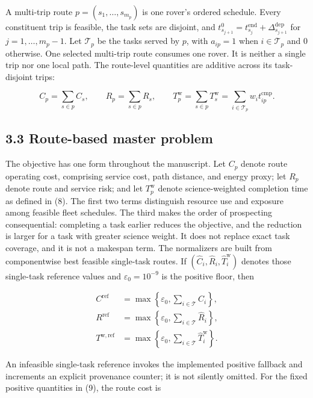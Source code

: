 \documentclass[
  11pt,
]{article}
\begin{document}
A multi-trip route \(p=(s_1,\ldots,s_{m_p})\) is one rover's ordered
schedule. Every constituent trip is feasible, the task sets are
disjoint, and
\(t_{s_{j+1}}^0=t_{s_j}^{\mathrm{end}}+ \Delta_{s_{j+1}}^{\mathrm{dep}}\)
for \(j=1,\ldots,m_p-1\). Let \(\mathcal{T}_p\) be the tasks served by
\(p\), with \(a_{ip}=1\) when \(i\in\mathcal{T}_p\) and \(0\) otherwise.
One selected multi-trip route consumes one rover. It is neither a single
trip nor one local path. The route-level quantities are additive across
its task-disjoint trips:

\[
C_p=\sum_{s\in p}C_s,\qquad
R_p=\sum_{s\in p}R_s,\qquad
T_p^{\mathrm{w}}=\sum_{s\in p}T_s^{\mathrm{w}}
=\sum_{i\in\mathcal{T}_p}w_i t_{ip}^{\mathrm{cmp}}.
\tag{8}
\]

\hypertarget{route-based-master-problem}{%
\subsection{3.3 Route-based master
problem}\label{route-based-master-problem}}

The objective has one form throughout the manuscript. Let \(C_p\) denote
route operating cost, comprising service cost, path distance, and energy
proxy; let \(R_p\) denote route and service risk; and let
\(T_p^{\mathrm{w}}\) denote science-weighted completion time as defined
in (8). The first two terms distinguish resource use and exposure among
feasible fleet schedules. The third makes the order of prospecting
consequential: completing a task earlier reduces the objective, and the
reduction is larger for a task with greater science weight. It does not
replace exact task coverage, and it is not a makespan term. The
normalizers are built from componentwise best feasible single-task
routes. If \((\widehat C_i,\widehat R_i,\widehat T_i^{\mathrm{w}})\)
denotes those single-task reference values and \(\varepsilon_0=10^{-9}\)
is the positive floor, then

\[
\begin{aligned}
C^{\mathrm{ref}}&=\max\!\left\{\varepsilon_0,
\sum_{i\in\mathcal{T}}\widehat C_i\right\},\\
R^{\mathrm{ref}}&=\max\!\left\{\varepsilon_0,
\sum_{i\in\mathcal{T}}\widehat R_i\right\},\\
T^{\mathrm{w},\mathrm{ref}}&=\max\!\left\{\varepsilon_0,
\sum_{i\in\mathcal{T}}\widehat T_i^{\mathrm{w}}\right\}.
\end{aligned}
\tag{9}
\]

An infeasible single-task reference invokes the implemented positive
fallback and increments an explicit provenance counter; it is not
silently omitted. For the fixed positive quantities in (9), the route
cost is
\end{document}
